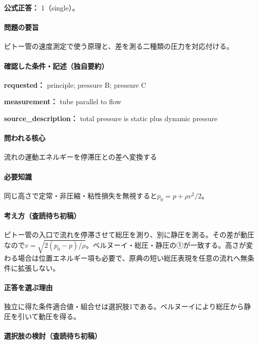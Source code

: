 \textbf{公式正答：} 1（single）。

\paragraph{問題の要旨} ピトー管の速度測定で使う原理と、差を測る二種類の圧力を対応付ける。

\paragraph{確認した条件・記述（独自要約）}\mbox{}\par

\noindent\textbf{requested：} principle; pressure B; pressure C\par

\noindent\textbf{measurement：} tube parallel to flow\par

\noindent\textbf{source\_description：} total pressure is static plus dynamic pressure\par

\paragraph{問われる核心} 流れの運動エネルギーを停滞圧との差へ変換する

\paragraph{必要知識} 同じ高さで定常・非圧縮・粘性損失を無視すると\(p_0=p+\rho v^2/2\)。

\paragraph{考え方（査読待ち初稿）} ピトー管の入口で流れを停滞させて総圧を測り、別に静圧を測る。その差が動圧なので\(v=\sqrt{2(p_0-p)/\rho}\)。ベルヌーイ・総圧・静圧の①が一致する。高さが変わる場合は位置エネルギー項も必要で、原典の短い総圧表現を任意の流れへ無条件に拡張しない。

\paragraph{正答を選ぶ理由} 独立に得た条件適合値・組合せは選択肢1である。ベルヌーイにより総圧から静圧を引いて動圧を得る。

\paragraph{選択肢の検討（査読待ち初稿）}\mbox{}\par

